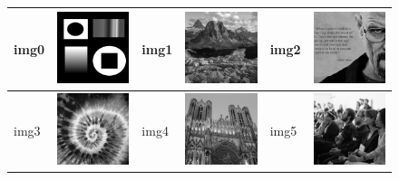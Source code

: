 \documentclass{article}
\begin{document}
\begin{figure}[!htp]
\begin{center}
\begin{tabular}[t]{|ll|ll|ll|}
\hline
img0 & \includegraphics[width=3cm]{../imgs/input/imgs_gray/img00.png} &
img1 & \includegraphics[width=3cm]{../imgs/input/imgs_gray/img01.png} &
img2 & \includegraphics[width=3cm]{../imgs/input/imgs_gray/img02.png} \\
\hline
img3 & \includegraphics[width=3cm]{../imgs/input/imgs_gray/img03.png} &
img4 & \includegraphics[width=3cm]{../imgs/input/imgs_gray/img04.png} &
img5 & \includegraphics[width=3cm]{../imgs/input/imgs_gray/img05.png} \\

\end{tabular}
\end{center}
\end{figure}
\end{document}
